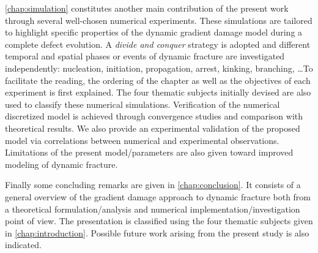 \cref{chap:simulation} constitutes another main contribution of the present work through several well-chosen numerical experiments. These simulations are tailored to highlight specific properties of the dynamic gradient damage model during a complete defect evolution. A \emph{divide and conquer} strategy is adopted and different temporal and spatial phases or events of dynamic fracture are investigated independently: nucleation, initiation, propagation, arrest, kinking, branching, \ldots To facilitate the reading, the ordering of the chapter as well as the objectives of each experiment is first explained. The four thematic subjects initially devised are also used to classify these numerical simulations. Verification of the numerical discretized model is achieved through convergence studies and comparison with theoretical results. We also provide an experimental validation of the proposed model via correlations between numerical and experimental observations. Limitations of the present model/parameters are also given toward improved modeling of dynamic fracture.

Finally some concluding remarks are given in \cref{chap:conclusion}. It consists of a general overview of the gradient damage approach to dynamic fracture both from a theoretical formulation/analysis and numerical implementation/investigation point of view. The presentation is classified using the four thematic subjects given in \cref{chap:introduction}. Possible future work arising from the present study is also indicated. 

